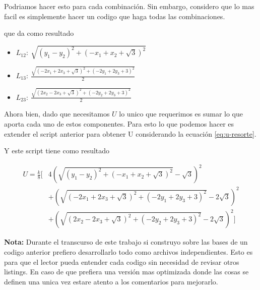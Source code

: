 \documentclass[12pt]{amsart}
\begin{document}
  Podriamos hacer esto para cada combinación. Sin embargo, considero que lo mas facil es simplemente hacer un codigo que haga todas las combinaciones.

  

  que da como resultado

  \begin{itemize}
    \item $L_{12}:\ \sqrt{\left(y_{1} - y_{2}\right)^{2} + \left(- x_{1} + x_{2} + \sqrt{3}\right)^{2}}$
    \item $L_{13}:\ \frac{\sqrt{\left(- 2 x_{1} + 2 x_{3} + \sqrt{3}\right)^{2} + \left(- 2 y_{1} + 2 y_{3} + 3\right)^{2}}}{2}$
    \item $L_{23}:\ \frac{\sqrt{\left(2 x_{2} - 2 x_{3} + \sqrt{3}\right)^{2} + \left(- 2 y_{2} + 2 y_{3} + 3\right)^{2}}}{2}$
  \end{itemize}

  Ahora bien, dado que necesitamos $U$ lo unico que requerimos es sumar lo que aporta cada uno de estos componentes. Para esto lo que podemos hacer es extender el script anterior para obtener U considerando la ecuación \ref{eq:u-resorte}.

  

  Y este script tiene como resultado

  \begin{equation}
    \begin{aligned}
      U = \frac{k}{8} \Biggl[ & 4 \left( \sqrt{(y_{1} - y_{2})^{2} + (- x_{1} + x_{2} + \sqrt{3})^{2}} - \sqrt{3} \right)^{2} \\
      & + \left( \sqrt{(- 2 x_{1} + 2 x_{3} + \sqrt{3})^{2} + (- 2 y_{1} + 2 y_{3} + 3)^{2}} - 2 \sqrt{3} \right)^{2} \\
      & + \left( \sqrt{(2 x_{2} - 2 x_{3} + \sqrt{3})^{2} + (- 2 y_{2} + 2 y_{3} + 3)^{2}} - 2 \sqrt{3} \right)^{2} \Biggr]
    \end{aligned}
  \end{equation}

  \textbf{Nota:} Durante el transcurso de este trabajo si construyo sobre las bases de un codigo anterior prefiero desarrollarlo todo como archivos independientes. Esto es para que el lector pueda entender cada codigo sin necesidad de revisar otros listings. En caso de que prefiera una versión mas optimizada donde las cosas se definen una unica vez estare atento a los comentarios para mejorarlo.
\end{document}
